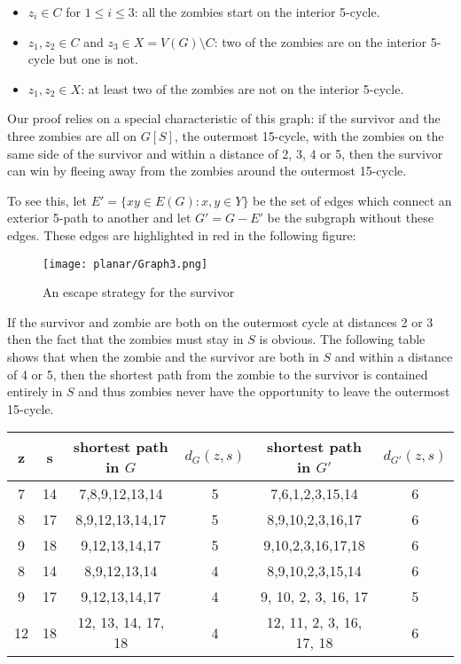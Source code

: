 \begin{itemize}
\item $z_i \in C$ for $1 \leq i \leq 3$: all the zombies start on the interior 5-cycle.
\item $z_1, z_2 \in C$ and $z_3 \in X = V(G) \setminus C$: two of the zombies are on the interior 5-cycle but one is not.
\item $z_1, z_2 \in X$: at least two of the zombies are not on the interior 5-cycle.
\end{itemize}

Our proof relies on a special characteristic of this graph: if the survivor and the three zombies are all on $G[S]$, the outermost 15-cycle,  with
the zombies on the same side of the survivor and within a distance of 2, 3, 4 or 5, then the survivor can win by fleeing away from the zombies around the outermost 15-cycle.

To see this, let $E' = \{xy \in E(G) : x, y \in Y\}$ be the set of edges which connect an exterior 5-path to another and let $G' = G - E'$ be the subgraph without these edges.
These edges are highlighted in red in the following figure:

\begin{figure}[!h]
\centering
\texttt{[image: planar/Graph3.png]}
\caption{An escape strategy for the survivor} \label{fig:planarG2}
\end{figure}

If the survivor and zombie are both on the outermost cycle at distances 2 or 3 then
the fact that the zombies must stay in $S$ is obvious.
The following table shows that when the zombie and the survivor are both in $S$ and within a distance of 4 or 5, then the shortest path from the zombie to the survivor is contained entirely in $S$ and thus zombies never have the opportunity to leave the outermost 15-cycle.

\begin{tabular}{c | c | c | c | c | c}
z & s & shortest path in $G$ & $d_{G}(z,s)$ & shortest path in $G'$ & $d_{G'}(z,s)$  \\
\hline
7 & 14 & 7,8,9,12,13,14 & 5 & 7,6,1,2,3,15,14 & 6 \\
8 & 17 & 8,9,12,13,14,17 & 5 & 8,9,10,2,3,16,17 & 6 \\
9 & 18 & 9,12,13,14,17 & 5 & 9,10,2,3,16,17,18 & 6 \\
\hline
8 & 14 & 8,9,12,13,14 & 4 & 8,9,10,2,3,15,14 & 6 \\
9 & 17 & 9,12,13,14,17 & 4 & 9, 10, 2, 3, 16, 17 & 5 \\
12 & 18 & 12, 13, 14, 17, 18 & 4 & 12, 11, 2, 3, 16, 17, 18 & 6
\end{tabular}

